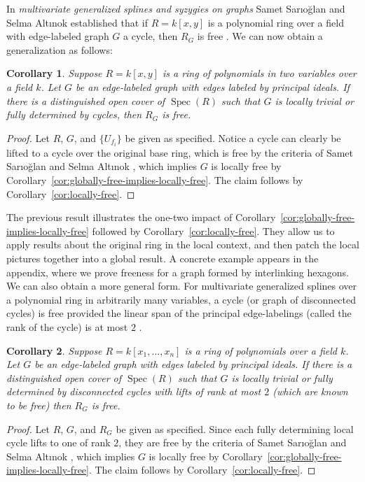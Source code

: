 \documentclass{article}
\DeclareMathOperator{\Spec}{Spec}
\newtheorem{corollary}{Corollary}
\begin{document}
In \textit{multivariate generalized splines and syzygies on graphs} Samet Sar{\i}o\u{g}lan and Selma Alt{\i}nok established that if $R = k[x,y]$ is a polynomial ring over a field with edge-labeled graph $G$ a cycle, then $R_{G}$ is free \cite{sarioglan2024multivariate}. We can now obtain a generalization as follows:




\begin{corollary}
\label{cor:local-cycle-free}
Suppose $R = k[x,y]$ is a ring of polynomials in two variables over a field $k$. Let $G$ be an edge-labeled graph with edges labeled by principal ideals. If there is a distinguished open cover of $\Spec(R)$ such that $G$ is locally trivial or fully determined by cycles, then $R_G$ is free.
\end{corollary}
\begin{proof}
Let $R$, $G$, and $\{U_{f_i}\}$ be given as specified. Notice a cycle can clearly be lifted to a cycle over the original base ring, which is free by the criteria of Samet Sar{\i}o\u{g}lan and Selma Alt{\i}nok  \cite{sarioglan2024multivariate}, which implies $G$ is locally free by Corollary~\ref{cor:globally-free-implies-locally-free}. The claim follows by Corollary~\ref{cor:locally-free}.
\end{proof}

The previous result illustrates the one-two impact of Corollary~\ref{cor:globally-free-implies-locally-free} followed by Corollary~\ref{cor:locally-free}. They allow us to apply results about the original ring in the local context, and then patch the local pictures together into a global result. A concrete example appears in the appendix, where we prove freeness for a graph formed by interlinking hexagons. We can also obtain a more general form. For multivariate generalized splines over a polynomial ring in arbitrarily many variables, a cycle (or graph of disconnected cycles) is free provided the linear span of the principal edge-labelings (called the rank of the cycle) is at most $2$ \cite{sarioglan2024multivariate}.

\begin{corollary}
\label{cor:local-cycle-free2}
Suppose $R = k[x_1, \dots, x_n]$ is a ring of polynomials over a field $k$. Let $G$ be an edge-labeled graph with edges labeled by principal ideals. If there is a distinguished open cover of $\Spec(R)$ such that $G$ is locally trivial or fully determined by disconnected cycles with lifts of rank at most $2$ (which are known to be free) then $R_G$ is free.
\end{corollary}
\begin{proof}
Let $R$, $G$, and $R_G$ be given as specified. Since each fully determining local cycle lifts to one of rank $2$, they are free by the criteria of Samet Sar{\i}o\u{g}lan and Selma Alt{\i}nok  \cite{sarioglan2024multivariate}, which implies $G$ is locally free by Corollary~\ref{cor:globally-free-implies-locally-free}. The claim follows by Corollary~\ref{cor:locally-free}.
\end{proof}
\end{document}
